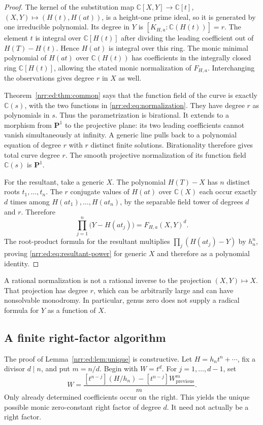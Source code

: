 \documentclass[11pt,letterpaper]{article}
\theoremstyle{definition}
\theoremstyle{remark}
\newcommand{\C}{\mathbb C}
\newcommand{\field}{K_{H,a}}
\begin{document}
\begin{proof}
The kernel of the substitution map
$\C[X,Y]\to\C[t]$, $(X,Y)\mapsto(H(t),H(at))$, is a height-one prime ideal,
so it is generated by one irreducible polynomial. Its degree in $Y$ is
$[\field:\C(H(t))]=r$. The element $t$ is integral over $\C[H(t)]$ after
dividing the leading coefficient out of $H(T)-H(t)$. Hence $H(at)$ is integral
over this ring. The monic minimal polynomial of $H(at)$ over $\C(H(t))$ has
coefficients in the integrally closed ring $\C[H(t)]$, allowing the stated
monic normalization of $F_{H,a}$. Interchanging the observations gives degree
$r$ in $X$ as well.

Theorem~\ref{nrr:ed:thm:common} says that the function field of the curve is exactly
$\C(s)$, with the two functions in \eqref{nrr:ed:eq:normalization}. They have degree
$r$ as polynomials in $s$. Thus the parametrization is birational. It extends
to a morphism from $\mathbf P^1$ to the projective plane: its two leading
coefficients cannot vanish simultaneously at infinity. A generic line pulls
back to a polynomial equation of degree $r$ with $r$ distinct finite solutions.
Birationality therefore gives total curve degree $r$. The smooth projective
normalization of its function field $\C(s)$ is $\mathbf P^1$.

For the resultant, take a generic $X$. The polynomial $H(T)-X$ has $n$ distinct
roots $t_1,\ldots,t_n$. The $r$ conjugate values of $H(at)$ over $\C(X)$ each
occur exactly $d$ times among $H(at_1),\ldots,H(at_n)$, by the separable field
tower of degrees $d$ and $r$. Therefore
\[
 \prod_{j=1}^n\bigl(Y-H(at_j)\bigr)=F_{H,a}(X,Y)^d.
\]
The root-product formula for the resultant multiplies
$\prod_j(H(at_j)-Y)$ by $h_n^n$, proving \eqref{nrr:ed:eq:resultant-power} for generic
$X$ and therefore as a polynomial identity.
\end{proof}

A rational normalization is not a rational inverse to the projection
$(X,Y)\mapsto X$. That projection has degree $r$, which can be arbitrarily
large and can have nonsolvable monodromy. In particular, genus zero does not
supply a radical formula for $Y$ as a function of $X$.

\subsection{A finite right-factor algorithm}

The proof of Lemma~\ref{nrr:ed:lem:unique} is constructive. Let
$H=h_nt^n+\cdots$, fix a divisor $d\mid n$, and put $m=n/d$. Begin with $W=t^d$.
For $j=1,\ldots,d-1$, set
\begin{equation}
 [t^{d-j}]W=
 \frac{[t^{n-j}](H/h_n)-[t^{n-j}]W_{\mathrm{previous}}^m}{m}.
 \label{nrr:ed:eq:candidate}
\end{equation}
Only already determined coefficients occur on the right. This yields the unique
possible monic zero-constant right factor of degree $d$. It need not actually
be a right factor.
\end{document}

